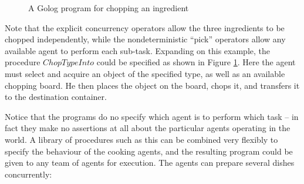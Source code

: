 %
\begin{figure}[!t]
\begin{centering}
\par\end{centering}

\caption{A Golog program for chopping an ingredient\label{fig:MIndiGolog:ChopTypeInto}}

\end{figure}


Note that the explicit concurrency operators allow the three ingredients
to be chopped independently, while the nondeterministic {}``pick''
operators allow any available agent to perform each sub-task. Expanding
on this example, the procedure $ChopTypeInto$ could be specified
as shown in Figure \ref{fig:MIndiGolog:ChopTypeInto}. Here the agent
must select and acquire an object of the specified type, as well as
an available chopping board. He then places the object on the board,
chops it, and transfers it to the destination container.

Notice that the programs do no specify which agent is to perform which
task -- in fact they make no assertions at all about the particular
agents operating in the world. A library of procedures such as this
can be combined very flexibly to specify the behaviour of the cooking
agents, and the resulting program could be given to any team of agents
for execution. The agents can prepare several dishes concurrently:

\\


